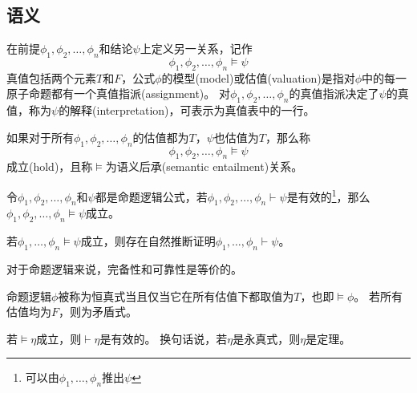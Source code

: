 \subsection{语义}
\begin{definition}[模型(model)]
在前提$\phi_1,\phi_2,\ldots,\phi_n$和结论$\psi$上定义另一关系，记作
\[\phi_1,\phi_2,\ldots,\phi_n\models\psi\]
真值包括两个元素$T$和$F$，公式$\phi$的模型(model)或估值(valuation)是指对$\phi$中的每一原子命题都有一个真值指派(assignment)。
对$\phi_1,\phi_2,\ldots,\phi_n$的真值指派决定了$\psi$的真值，称为$\psi$的解释(interpretation)，可表示为真值表中的一行。

如果对于所有$\phi_1,\phi_2,\ldots,\phi_n$的估值都为$T$，$\psi$也估值为$T$，那么称
\[\phi_1,\phi_2,\ldots,\phi_n\models\psi\]
成立(hold)，且称$\models$为语义后承(semantic entailment)关系。
\end{definition}
\begin{theorem}
令$\phi_1,\phi_2,\ldots,\phi_n$和$\psi$都是命题逻辑公式，若$\phi_1,\phi_2,\ldots,\phi_n\vdash\psi$是有效的\footnote{可以由$\phi_1,\ldots,\phi_n$推出$\psi$}，那么$\phi_1,\phi_2,\ldots,\phi_n\models\psi$成立。
\end{theorem}
\begin{theorem}
若$\phi_1,\ldots,\phi_n\models\psi$成立，则存在自然推断证明$\phi_1,\ldots,\phi_n\vdash\psi$。
\end{theorem}
\begin{theorem}
对于命题逻辑来说，完备性和可靠性是等价的。
\end{theorem}

\begin{definition}
命题逻辑$\phi$被称为恒真式当且仅当它在所有估值下都取值为$T$，也即$\models\phi$。
若所有估值均为$F$，则为矛盾式。
\end{definition}
\begin{theorem}
若$\models\eta$成立，则$\vdash\eta$是有效的。
换句话说，若$\eta$是永真式，则$\eta$是定理。
\end{theorem}

